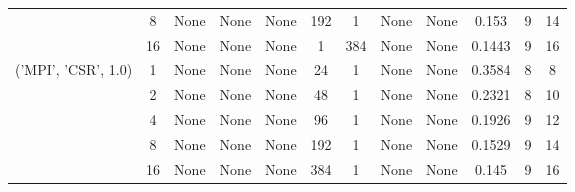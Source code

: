 \begin{tabular}{cccccccccccc}
& 8& None& None& None& 192& 1& None& None& 0.153& 9& 14\\
& 16& None& None& None& 1& 384& None& None& 0.1443& 9& 16\\
\hline
\multirow{5}{*}{('MPI', 'CSR', 1.0)}& 1& None& None& None& 24& 1& None& None& 0.3584& 8& 8\\
& 2& None& None& None& 48& 1& None& None& 0.2321& 8& 10\\
& 4& None& None& None& 96& 1& None& None& 0.1926& 9& 12\\
& 8& None& None& None& 192& 1& None& None& 0.1529& 9& 14\\
& 16& None& None& None& 384& 1& None& None& 0.145& 9& 16\\
\hline
\end{tabular}
